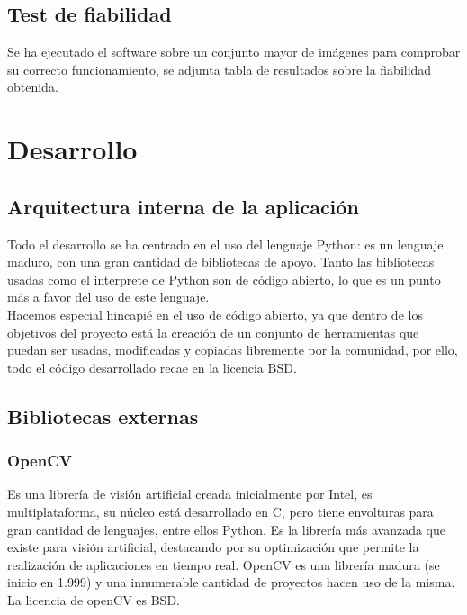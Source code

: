 	\subsection{Test de fiabilidad}
	Se ha ejecutado el software sobre un conjunto mayor de imágenes para comprobar su correcto funcionamiento, se adjunta tabla de resultados sobre la fiabilidad obtenida.\\ 
	
	\vfill
	\section{Desarrollo}

	\subsection{Arquitectura interna de la aplicación}
	Todo el desarrollo se ha centrado en el uso del lenguaje Python: es un lenguaje maduro, con una gran cantidad de bibliotecas de apoyo. Tanto las bibliotecas usadas como el interprete de Python son de código abierto, lo que es un punto más a favor del uso de este lenguaje.\\
	 Hacemos especial hincapié en el uso de código abierto, ya que dentro de los objetivos del proyecto está la creación de un conjunto de herramientas que puedan ser usadas, modificadas y copiadas libremente por la comunidad, por ello, todo el código desarrollado recae en la licencia BSD.
	\subsection{Bibliotecas externas}
	\subsubsection{OpenCV}
	Es una librería de visión artificial creada inicialmente por Intel, es multiplataforma, su núcleo está desarrollado en C, pero tiene envolturas para gran cantidad de lenguajes, entre ellos Python. Es la librería más avanzada que existe para visión artificial, destacando por su optimización que permite la realización de aplicaciones en tiempo real. OpenCV es una librería madura (se inicio en 1.999) y una innumerable cantidad de proyectos hacen uso de la misma.\\
	La licencia de openCV es BSD.
